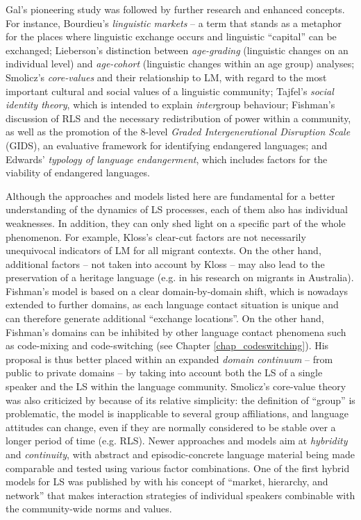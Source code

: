 \documentclass[output=paper]{langscibook}
\begin{document}
Gal's pioneering study was followed by further research and enhanced concepts. For instance, Bourdieu's \parencite*{Bourdieu1977, Bourdieu1982} \emph{linguistic markets} -- a term that stands as a metaphor for the places where linguistic exchange occurs and linguistic ``capital'' can be exchanged; Lieberson's \parencite*{Lieberson1980} distinction between \emph{age-grading} (linguistic changes on an individual level) and \emph{age-cohort} (linguistic changes within an age group) analyses; Smolicz's \parencite*{Smolicz1980} \emph{core-values} and their relationship to LM, with regard to the most important cultural and social values of a linguistic community; Tajfel's \parencite*{Tajfel1981} \emph{social identity theory}, which is intended to explain \emph{inter}group behaviour; Fishman's \parencite*{Fishman1991} discussion of RLS and the necessary redistribution of power within a community, as well as the promotion of the 8-level \textit{Graded Intergenerational Disruption Scale} (GIDS), an evaluative framework for identifying endangered languages; and Edwards' \parencite*{EdwardsJohn1992} \emph{typology of language endangerment}, which includes factors for the viability of endangered languages.

Although the approaches and models listed here are fundamental for a better understanding of the dynamics of LS processes, each of them also has individual weaknesses. In addition, they can only shed light on a specific part of the whole phenomenon. For example, Kloss's \parencite*{Kloss1966} clear-cut factors are not necessarily unequivocal indicators of LM for all migrant contexts. On the other hand, additional factors – not taken into account by Kloss – may also lead to the preservation of a heritage language (e.g. \citealt{Clyne1991}  in his research on migrants in Australia). Fishman's \parencite*{Fishman1972} model is based on a clear domain-by-domain shift, which is nowadays extended to further domains, as each language contact situation is unique and can therefore generate additional ``exchange locations''. On the other hand, Fishman's domains can be inhibited by other language contact phenomena such as code-mixing and code-switching (see Chapter \ref{chap_codeswitching}). His proposal is thus better placed within an expanded \emph{domain continuum} -- from public to private domains -- by taking into account both the LS of a single speaker and the LS within the language community. Smolicz's \parencite*{Smolicz1980} core-value theory was also criticized by \textcite{Clyne1991} because of its relative simplicity: the definition of ``group'' is problematic, the model is inapplicable to several group affiliations, and language attitudes can change, even if they are normally considered to be stable over a longer period of time (e.g. RLS). Newer approaches and models aim at \emph{hybridity} and \emph{continuity}, with abstract and episodic-concrete language material being made comparable and tested using various factor combinations. One of the first hybrid models for LS was published by \textcite{Wei2002} with his concept of ``market, hierarchy, and network'' that makes interaction strategies of individual speakers combinable with the community-wide norms and values.
\end{document}

